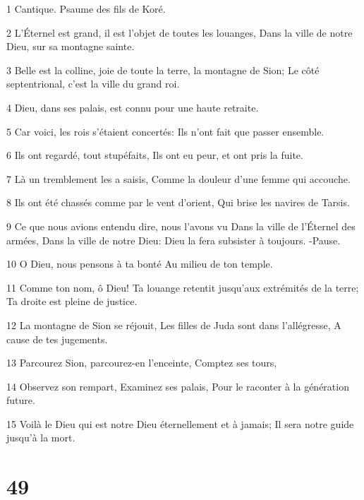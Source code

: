 \par 1 Cantique. Psaume des fils de Koré.
\par 2 L'Éternel est grand, il est l'objet de toutes les louanges, Dans la ville de notre Dieu, sur sa montagne sainte.
\par 3 Belle est la colline, joie de toute la terre, la montagne de Sion; Le côté septentrional, c'est la ville du grand roi.
\par 4 Dieu, dans ses palais, est connu pour une haute retraite.
\par 5 Car voici, les rois s'étaient concertés: Ils n'ont fait que passer ensemble.
\par 6 Ils ont regardé, tout stupéfaits, Ils ont eu peur, et ont pris la fuite.
\par 7 Là un tremblement les a saisis, Comme la douleur d'une femme qui accouche.
\par 8 Ils ont été chassés comme par le vent d'orient, Qui brise les navires de Tarsis.
\par 9 Ce que nous avions entendu dire, nous l'avons vu Dans la ville de l'Éternel des armées, Dans la ville de notre Dieu: Dieu la fera subsister à toujours. -Pause.
\par 10 O Dieu, nous pensons à ta bonté Au milieu de ton temple.
\par 11 Comme ton nom, ô Dieu! Ta louange retentit jusqu'aux extrémités de la terre; Ta droite est pleine de justice.
\par 12 La montagne de Sion se réjouit, Les filles de Juda sont dans l'allégresse, A cause de tes jugements.
\par 13 Parcourez Sion, parcourez-en l'enceinte, Comptez ses tours,
\par 14 Observez son rempart, Examinez ses palais, Pour le raconter à la génération future.
\par 15 Voilà le Dieu qui est notre Dieu éternellement et à jamais; Il sera notre guide jusqu'à la mort.

\chapter{49}

